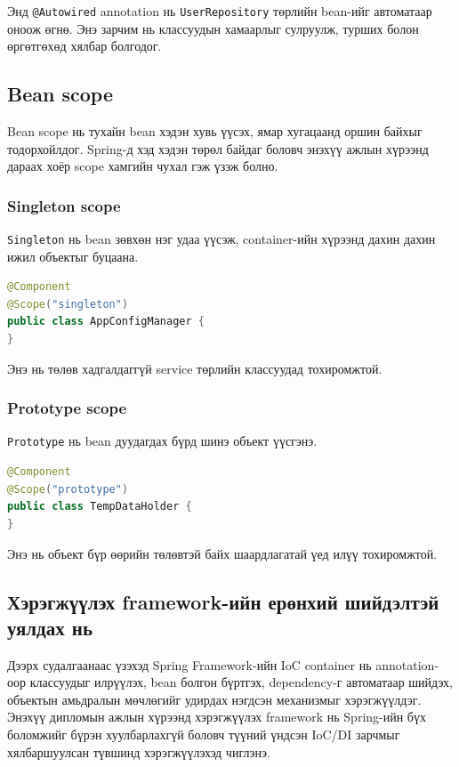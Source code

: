 Энд \texttt{@Autowired} annotation нь \texttt{UserRepository} төрлийн bean-ийг автоматаар оноож өгнө. Энэ зарчим нь классуудын хамаарлыг сулруулж, турших болон өргөтгөхөд хялбар болгодог.

\subsection{Bean scope}

Bean scope нь тухайн bean хэдэн хувь үүсэх, ямар хугацаанд оршин байхыг тодорхойлдог. Spring-д хэд хэдэн төрөл байдаг боловч энэхүү ажлын хүрээнд дараах хоёр scope хамгийн чухал гэж үзэж болно.

\subsubsection{Singleton scope}

\texttt{Singleton} нь bean зөвхөн нэг удаа үүсэж, container-ийн хүрээнд дахин дахин ижил объектыг буцаана.

\begin{lstlisting}[language=Java,frame=single, caption={Singleton scope ашигласан жишээ}, label={lst:singleton-scope-example}]
@Component
@Scope("singleton")
public class AppConfigManager {
}
\end{lstlisting}

Энэ нь төлөв хадгалдаггүй service төрлийн классуудад тохиромжтой.

\subsubsection{Prototype scope}

\texttt{Prototype} нь bean дуудагдах бүрд шинэ объект үүсгэнэ.

\begin{lstlisting}[language=Java, frame=single, caption={Prototype scope ашигласан жишээ}, label={lst:prototype-scope-example}]
@Component
@Scope("prototype")
public class TempDataHolder {
}
\end{lstlisting}

Энэ нь объект бүр өөрийн төлөвтэй байх шаардлагатай үед илүү тохиромжтой.

\subsection{Хэрэгжүүлэх framework-ийн ерөнхий шийдэлтэй уялдах нь}

Дээрх судалгаанаас үзэхэд Spring Framework-ийн IoC container нь annotation-оор классуудыг илрүүлэх, bean болгон бүртгэх, dependency-г автоматаар шийдэх, объектын амьдралын мөчлөгийг удирдах нэгдсэн механизмыг хэрэгжүүлдэг. Энэхүү дипломын ажлын хүрээнд хэрэгжүүлэх framework нь Spring-ийн бүх боломжийг бүрэн хуулбарлахгүй боловч түүний үндсэн IoC/DI зарчмыг хялбаршуулсан түвшинд хэрэгжүүлэхэд чиглэнэ.

